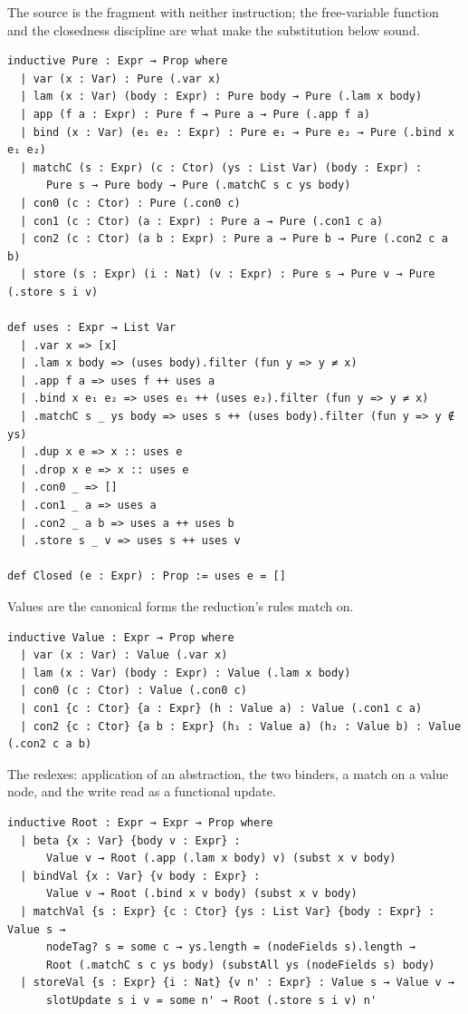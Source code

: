 \documentclass[11pt]{article}
\theoremstyle{remark}
\begin{document}
\noindent The source is the fragment with neither instruction; the free-variable
function and the closedness discipline are what make the substitution below sound.

\begin{lstlisting}
inductive Pure : Expr → Prop where
  | var (x : Var) : Pure (.var x)
  | lam (x : Var) (body : Expr) : Pure body → Pure (.lam x body)
  | app (f a : Expr) : Pure f → Pure a → Pure (.app f a)
  | bind (x : Var) (e₁ e₂ : Expr) : Pure e₁ → Pure e₂ → Pure (.bind x e₁ e₂)
  | matchC (s : Expr) (c : Ctor) (ys : List Var) (body : Expr) :
      Pure s → Pure body → Pure (.matchC s c ys body)
  | con0 (c : Ctor) : Pure (.con0 c)
  | con1 (c : Ctor) (a : Expr) : Pure a → Pure (.con1 c a)
  | con2 (c : Ctor) (a b : Expr) : Pure a → Pure b → Pure (.con2 c a b)
  | store (s : Expr) (i : Nat) (v : Expr) : Pure s → Pure v → Pure (.store s i v)

def uses : Expr → List Var
  | .var x => [x]
  | .lam x body => (uses body).filter (fun y => y ≠ x)
  | .app f a => uses f ++ uses a
  | .bind x e₁ e₂ => uses e₁ ++ (uses e₂).filter (fun y => y ≠ x)
  | .matchC s _ ys body => uses s ++ (uses body).filter (fun y => y ∉ ys)
  | .dup x e => x :: uses e
  | .drop x e => x :: uses e
  | .con0 _ => []
  | .con1 _ a => uses a
  | .con2 _ a b => uses a ++ uses b
  | .store s _ v => uses s ++ uses v

def Closed (e : Expr) : Prop := uses e = []
\end{lstlisting}

\noindent Values are the canonical forms the reduction's rules match on.

\begin{lstlisting}
inductive Value : Expr → Prop where
  | var (x : Var) : Value (.var x)
  | lam (x : Var) (body : Expr) : Value (.lam x body)
  | con0 (c : Ctor) : Value (.con0 c)
  | con1 {c : Ctor} {a : Expr} (h : Value a) : Value (.con1 c a)
  | con2 {c : Ctor} {a b : Expr} (h₁ : Value a) (h₂ : Value b) : Value (.con2 c a b)
\end{lstlisting}

\noindent The redexes: application of an abstraction, the two binders, a match on a
value node, and the write read as a functional update.

\begin{lstlisting}
inductive Root : Expr → Expr → Prop where
  | beta {x : Var} {body v : Expr} :
      Value v → Root (.app (.lam x body) v) (subst x v body)
  | bindVal {x : Var} {v body : Expr} :
      Value v → Root (.bind x v body) (subst x v body)
  | matchVal {s : Expr} {c : Ctor} {ys : List Var} {body : Expr} : Value s →
      nodeTag? s = some c → ys.length = (nodeFields s).length →
      Root (.matchC s c ys body) (substAll ys (nodeFields s) body)
  | storeVal {s : Expr} {i : Nat} {v n' : Expr} : Value s → Value v →
      slotUpdate s i v = some n' → Root (.store s i v) n'
\end{lstlisting}
\end{document}

